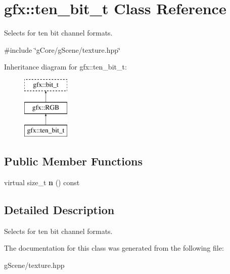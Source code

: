 \hypertarget{classgfx_1_1ten__bit__t}{\section{gfx\-:\-:ten\-\_\-bit\-\_\-t Class Reference}
\label{classgfx_1_1ten__bit__t}
}


Selects for ten bit channel formats.  




{\ttfamily \#include \char`\"{}g\-Core/g\-Scene/texture.\-hpp\char`\"{}}

Inheritance diagram for gfx\-:\-:ten\-\_\-bit\-\_\-t\-:\begin{figure}[H]
\begin{center}
\leavevmode
\includegraphics[height=3.000000cm]{classgfx_1_1ten__bit__t}
\end{center}
\end{figure}
\subsection*{Public Member Functions}
\begin{DoxyCompactItemize}
\item 
\hypertarget{classgfx_1_1ten__bit__t_aeb932bf697f17715cdbb145fef1a2ad7}{virtual size\-\_\-t {\bfseries n} () const }\label{classgfx_1_1ten__bit__t_aeb932bf697f17715cdbb145fef1a2ad7}

\end{DoxyCompactItemize}


\subsection{Detailed Description}
Selects for ten bit channel formats. 

The documentation for this class was generated from the following file\-:\begin{DoxyCompactItemize}
\item 
g\-Scene/texture.\-hpp\end{DoxyCompactItemize}
